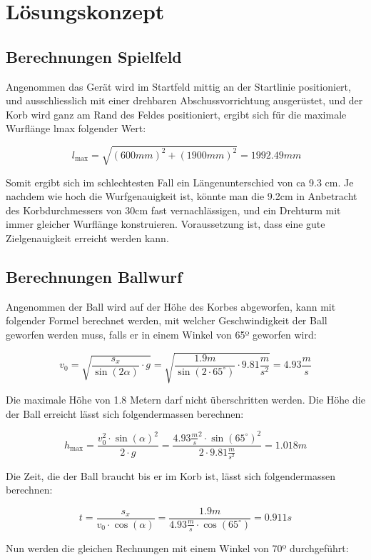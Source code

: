 \section{Lösungskonzept}

\subsection{Berechnungen Spielfeld}

Angenommen das Gerät wird im Startfeld mittig an der Startlinie positioniert, und ausschliesslich mit einer drehbaren Abschussvorrichtung ausgerüstet, und der Korb wird ganz am Rand des Feldes positioniert, ergibt sich für die maximale Wurflänge lmax folgender Wert: 
 
\[\ l_\text{max} = \sqrt{(600mm)^2 + (1900mm)^2} = 1992.49mm \]

Somit ergibt sich im schlechtesten Fall ein Längenunterschied von ca 9.3 cm. Je nachdem wie hoch die Wurfgenauigkeit ist, könnte man die 9.2cm in Anbetracht des Korbdurchmessers von 30cm fast vernachlässigen, und ein Drehturm mit immer gleicher Wurflänge konstruieren. Voraussetzung ist, dass eine gute Zielgenauigkeit erreicht werden kann.

\subsection{Berechnungen Ballwurf}

Angenommen der Ball wird auf der Höhe des Korbes abgeworfen, kann mit folgender Formel berechnet werden, mit welcher Geschwindigkeit der Ball geworfen werden muss, falls er in einem Winkel von 65º geworfen wird:

\[ v_0 = \sqrt{ \frac{s_x}{\sin(2\alpha)} \cdot g } = \sqrt{ \frac{1.9m}{\sin(2 \cdot 65^\circ)} \cdot 9.81 \frac{m}{s^2}} = 4.93 \frac{m}{s} \]

Die maximale Höhe von 1.8 Metern darf nicht überschritten werden. Die Höhe die der Ball erreicht lässt sich folgendermassen berechnen:

\[ h_\text{max} = \frac{v_0^2 \cdot \sin(\alpha)^2}{2 \cdot g} = \frac{4.93 \frac{m}{s}^2 \cdot \sin(65^\circ)^2}{2 \cdot 9.81 \frac{m}{s^2}} = 1.018m \]

Die Zeit, die der Ball braucht bis er im Korb ist, lässt sich folgendermassen berechnen:

\[ t = \frac{s_x}{v_0 \cdot \cos(\alpha)} = \frac{1.9m}{4.93 \frac{m}{s} \cdot \cos(65^\circ)} = 0.911s \]

Nun werden die gleichen Rechnungen mit einem Winkel von 70º durchgeführt:

